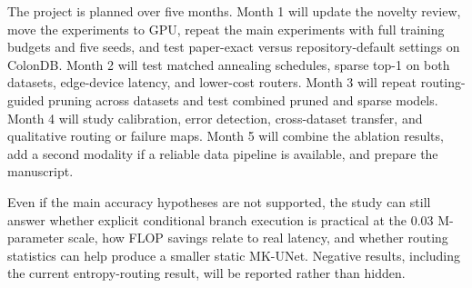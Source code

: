 \documentclass[10pt,a4paper]{article}
\begin{document}
The project is planned over five months. Month 1 will update the novelty review, move the experiments to GPU, repeat the main experiments with full training budgets and five seeds, and test paper-exact versus repository-default settings on ColonDB. Month 2 will test matched annealing schedules, sparse top-1 on both datasets, edge-device latency, and lower-cost routers. Month 3 will repeat routing-guided pruning across datasets and test combined pruned and sparse models. Month 4 will study calibration, error detection, cross-dataset transfer, and qualitative routing or failure maps. Month 5 will combine the ablation results, add a second modality if a reliable data pipeline is available, and prepare the manuscript.

Even if the main accuracy hypotheses are not supported, the study can still answer whether explicit conditional branch execution is practical at the 0.03 M-parameter scale, how FLOP savings relate to real latency, and whether routing statistics can help produce a smaller static MK-UNet. Negative results, including the current entropy-routing result, will be reported rather than hidden.




\end{document}
